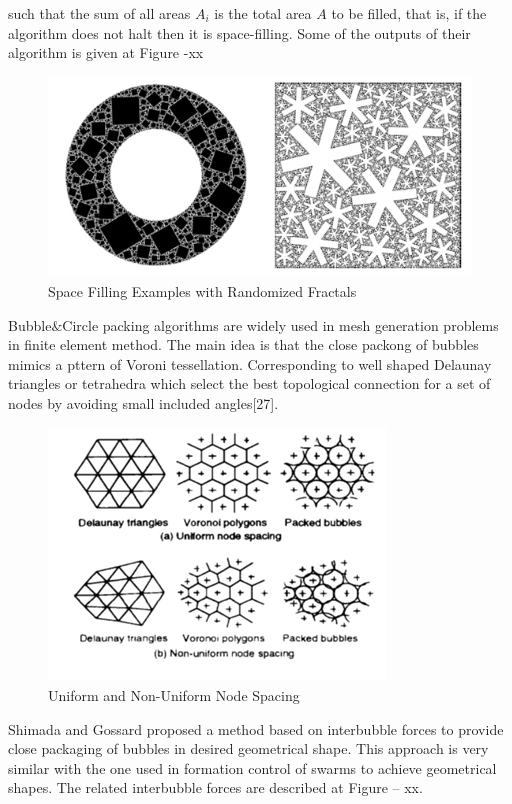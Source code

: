 \documentclass[twoside]{article}
\begin{document}
such that the sum of all areas $A_i$ is the total area $A$ to be filled, that is, if the algorithm does not halt then it is space-filling. 
Some of the outputs of their algorithm is given at Figure -xx



\begin{figure}[H]
	\caption{Space Filling Examples with Randomized Fractals}
	\centering
	\includegraphics[scale = 1]{randomized1}
\end{figure}


Bubble$\&$Circle packing algorithms are widely used in mesh generation problems in finite element method. The main idea is that the close packong of bubbles mimics a pttern of Voroni tessellation. Corresponding to well shaped Delaunay triangles or tetrahedra which select the best topological connection for a set of nodes by avoiding small included angles[27].


\begin{figure}[H]
	\caption{Uniform and Non-Uniform Node Spacing}
	\centering
	\includegraphics[scale = 1]{nodespacing}
\end{figure}

Shimada and Gossard proposed a method based on interbubble forces to provide close packaging of bubbles in desired geometrical shape. This approach is very similar with the one used in formation control of swarms to achieve geometrical shapes. The related interbubble forces are described at Figure – xx.
\end{document}
